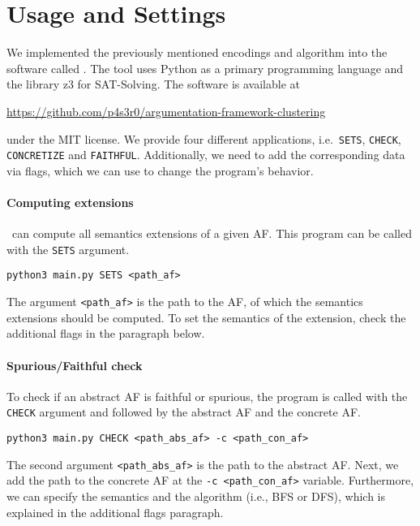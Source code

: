 \section{Usage and Settings}
\label{sec:ImplementationUsageAndSettings}
We implemented the previously mentioned encodings and algorithm into the software called \prog. The tool uses Python as a primary programming language and the library z3 for SAT-Solving. The software is available at

\begin{center}
    \url{https://github.com/p4s3r0/argumentation-framework-clustering}
\end{center}

\noindent
under the MIT license. We provide four different applications, i.e.\ \texttt{SETS}, \texttt{CHECK}, \texttt{CONCRETIZE} and \texttt{FAITHFUL}. Additionally, we need to add the corresponding data via flags, which we can use to change the program's behavior.

\paragraph{Computing extensions} \prog\ can compute all semantics extensions of a given AF. This program can be called with the \texttt{SETS} argument.

\begin{center}
    \texttt{python3 main.py SETS <path\_af>}
\end{center}

The argument \texttt{<path\_af>} is the path to the AF, of which the semantics extensions should be computed. To set the semantics of the extension, check the additional flags in the paragraph below.

\paragraph{Spurious/Faithful check} To check if an abstract AF is faithful or spurious, the program is called with the \texttt{CHECK} argument and followed by the abstract AF and the concrete AF.

\begin{center}
    \texttt{python3 main.py CHECK <path\_abs\_af> -c <path\_con\_af>}
\end{center}

The second argument \texttt{<path\_abs\_af>} is the path to the abstract AF. Next, we add the path to the concrete AF at the \texttt{-c <path\_con\_af>} variable. Furthermore, we can specify the semantics and the algorithm (i.e., BFS or DFS), which is explained in the additional flags paragraph.


